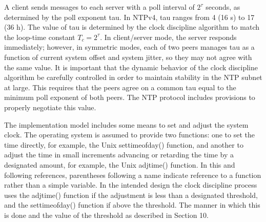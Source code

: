 A client sends messages to each server with a poll interval of $ 2^\tau $
seconds, as determined by the poll exponent tau. In NTPv4, tau
ranges from 4 (16 s) to 17 (36 h). The value of tau is determined by
the clock discipline algorithm to match the loop-time constant $ T_c = 2^\tau $.
In client/server mode, the server responds immediately;
however, in symmetric modes, each of two peers manages tau as a
function of current system offset and system jitter, so they may not
agree with the same value. It is important that the dynamic behavior
of the clock discipline algorithm be carefully controlled in order to
maintain stability in the NTP subnet at large. This requires that
the peers agree on a common tau equal to the minimum poll exponent of
both peers. The NTP protocol includes provisions to properly
negotiate this value.

The implementation model includes some means to set and adjust the
system clock. The operating system is assumed to provide two
functions: one to set the time directly, for example, the Unix
settimeofday() function, and another to adjust the time in small
increments advancing or retarding the time by a designated amount,
for example, the Unix adjtime() function. In this and following
references, parentheses following a name indicate reference to a
function rather than a simple variable. In the intended design the
clock discipline process uses the adjtime() function if the
adjustment is less than a designated threshold, and the
settimeofday() function if above the threshold. The manner in which
this is done and the value of the threshold as described in
Section 10.
